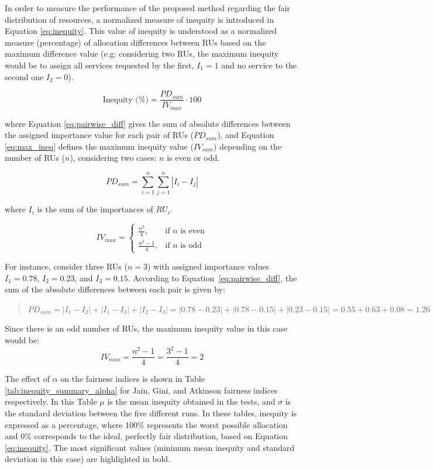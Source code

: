 \documentclass[preprint,12pt]{elsarticle}
\begin{document}
In order to measure the performance of the proposed method regarding the fair distribution of resources, a normalized measure of inequity is introduced in Equation \ref{eq:inequity}. This value of inequity is understood as a normalized measure (percentage) of allocation differences between RUs based on the maximum difference value (e.g: considering two RUs, the maximum inequity would be to assign all services requested by the first,  $ I_1 = 1 $ and no service to the second one $ I_2 = 0 $).

\begin{equation}
\text{Inequity (\%)} = \frac{PD_{sum}}{IV_{max}} \cdot 100
\label{eq:inequity}
\end{equation}

where Equation \ref{eq:pairwise_diff} gives the sum of absolute differences between the assigned importance value for each pair of RUs ($PD_{sum}$), and Equation \ref{eq:max_ineq} defines the maximum inequity value ($IV_{sum}$) depending on the number of RUs (\(n\)), considering two cases: \(n\) is even or odd. 

\begin{equation}
PD_{sum} = \sum_{i=1}^{n} \sum_{j=1}^{n} \left| I_i - I_j \right|
\label{eq:pairwise_diff}
\end{equation}

where $I_i$ is the sum of the importances of $RU_i$.

\begin{equation}
IV_{max} =
\begin{cases}
\frac{n^2}{4}, & \text{if } n \text{ is even}\\[8pt]
\frac{n^2-1}{4}, & \text{if } n \text{ is odd}
\end{cases}
\label{eq:max_ineq}
\end{equation}

For instance, consider three RUs ($n=3$) with assigned importance values $I_1=0.78$, $I_2=0.23$, and $I_3=0.15$. According to Equation~\ref{eq:pairwise_diff}, the sum of the absolute differences between each pair is given by:
\begin{quote}
    $PD_{sum} = |I_1 - I_2| + |I_1 - I_3| + |I_2 - I_3| = |0.78 - 0.23| + |0.78 - 0.15| + |0.23 - 0.15| = 0.55 + 0.63 + 0.08 = 1.26$
\end{quote}

Since there is an odd number of RUs, the maximum inequity value in this case would be: 
$$ IV_{max} = \frac{n^{2} - 1}{4} = \frac{3^2 - 1}{4} = 2 $$

The effect of $\alpha$ on the fairness indices is shown in Table \ref{tab:inequity_summary_alpha} for Jain, Gini, and Atkinson fairness indices respectively. In this Table $\mu$ is the mean inequity obtained in the tests, and $\sigma$ is the standard deviation between the five different runs. In these tables, inequity is expressed as a percentage, where 100\% represents the worst possible allocation and 0\% corresponds to the ideal, perfectly fair distribution, based on Equation \ref{eq:inequity}. The most significant values (minimum mean inequity and standard deviation in this case) are highlighted in bold.
\end{document}
